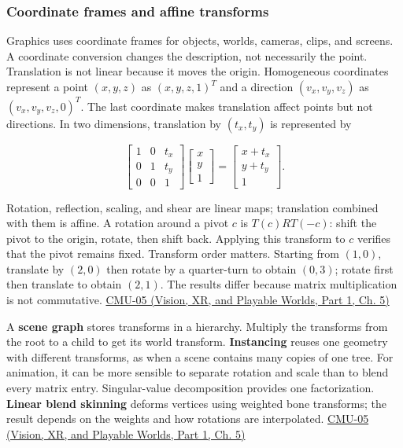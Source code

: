 \subsubsection{Coordinate frames and affine transforms}\label{03-visual-computing-i-ch001-coordinate-frames-and-affine-transforms}

\hypertarget{03-visual-computing-i-ch001-coordinate-frames-and-affine-transforms}{}

Graphics uses coordinate frames for objects, worlds, cameras, clips, and screens. A coordinate conversion changes the description, not necessarily the point. Translation is not linear because it moves the origin. Homogeneous coordinates represent a point \((x,y,z)\) as \((x,y,z,1)^T\) and a direction \((v_x,v_y,v_z)\) as \((v_x,v_y,v_z,0)^T\). The last coordinate makes translation affect points but not directions. In two dimensions, translation by \((t_x,t_y)\) is represented by

\[
\begin{bmatrix}1&0&t_x\\0&1&t_y\\0&0&1\end{bmatrix}
\begin{bmatrix}x\\y\\1\end{bmatrix}
=\begin{bmatrix}x+t_x\\y+t_y\\1\end{bmatrix}.
\]

Rotation, reflection, scaling, and shear are linear maps; translation combined with them is affine. A rotation around a pivot \(c\) is \(T(c)RT(-c)\): shift the pivot to the origin, rotate, then shift back. Applying this transform to \(c\) verifies that the pivot remains fixed. Transform order matters. Starting from \((1,0)\), translate by \((2,0)\) then rotate by a quarter-turn to obtain \((0,3)\); rotate first then translate to obtain \((2,1)\). The results differ because matrix multiplication is not commutative. \href{../07-Vision-XR-and-Playable-Worlds-P01/main.pdf\#nameddest=04-visual-computing-ii-ch036-cmu-05---spatial-transformations}{CMU-05 (Vision, XR, and Playable Worlds, Part 1, Ch. 5)}

A \textbf{scene graph} stores transforms in a hierarchy. Multiply the transforms from the root to a child to get its world transform. \textbf{Instancing} reuses one geometry with different transforms, as when a scene contains many copies of one tree. For animation, it can be more sensible to separate rotation and scale than to blend every matrix entry. Singular-value decomposition provides one factorization. \textbf{Linear blend skinning} deforms vertices using weighted bone transforms; the result depends on the weights and how rotations are interpolated. \href{../07-Vision-XR-and-Playable-Worlds-P01/main.pdf\#nameddest=04-visual-computing-ii-ch036-cmu-05---spatial-transformations}{CMU-05 (Vision, XR, and Playable Worlds, Part 1, Ch. 5)}

